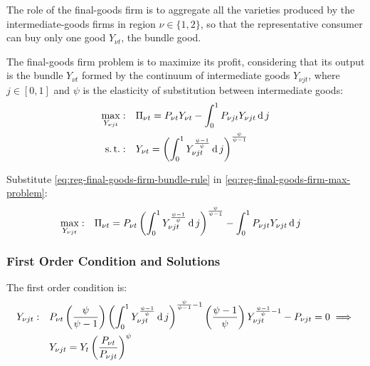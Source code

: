 \documentclass[
thesis.tex
]{subfiles}
\begin{document}
The role of the final-goods firm is to aggregate all the varieties produced by the intermediate-goods firms in region $\nu \in \{1,2\}$, so that the representative consumer can buy only one good $Y_{\nu t}$, the bundle good.



The final-goods firm problem is to maximize its profit, considering that its output is the bundle $Y_{\nu t}$ formed by the continuum of intermediate goods $Y_{\nu jt}$, where $j \in [0,1]$ and $\psi$ is the elasticity of substitution between intermediate goods:
\begin{align}
	\max_{Y_{\nu jt}}: &\quad \Pi_{\nu t} = P_{\nu t} Y_{\nu t} - \int_{0}^{1} P_{\nu jt} Y_{\nu jt} \operatorname{d} j \label{eq:reg-final-goods-firm-max-problem} \\
	\operatorname{s.t.}: & \quad Y_{\nu t} = \left( \int_{0}^{1} Y_{\nu jt}^{\frac{\psi-1}{\psi}} \operatorname{d} j \right)^{\frac{\psi}{\psi-1}} \label{eq:reg-final-goods-firm-bundle-rule}
\end{align}

Substitute \ref{eq:reg-final-goods-firm-bundle-rule} in \ref{eq:reg-final-goods-firm-max-problem}:
\begin{align}
	\label{eq:reg-final-goods-firm-max-problem-2}
	\max_{Y_{\nu jt}}: & \quad \Pi_{\nu t} = P_{\nu t} \left( \int_{0}^{1} Y_{\nu jt}^{\frac{\psi-1}{\psi}} \operatorname{d} j \right)^{\frac{\psi}{\psi-1}} - \int_{0}^{1} P_{\nu jt} Y_{\nu jt} \operatorname{d} j
\end{align}

\subsubsection*{First Order Condition and Solutions}

The first order condition is:
\begin{align}
	Y_{\nu jt}:\quad & P_{\nu t} \left( \frac{\psi}{\psi-1} \right) \left( \int_{0}^{1} Y_{\nu jt}^{\frac{\psi-1}{\psi}} \operatorname{d} j \right)^{\frac{\psi}{\psi-1}-1} \left( \frac{\psi-1}{\psi} \right) Y_{\nu jt}^{\frac{\psi-1}{\psi}-1} - P_{\nu jt} = 0 \implies \nonumber \\
	\label{eq:reg-final-goods-firm-FOC}
	& Y_{\nu jt} = Y_t \left( \frac{P_{\nu t}}{P_{\nu jt}} \right)^{\psi}
\end{align}
\end{document}
